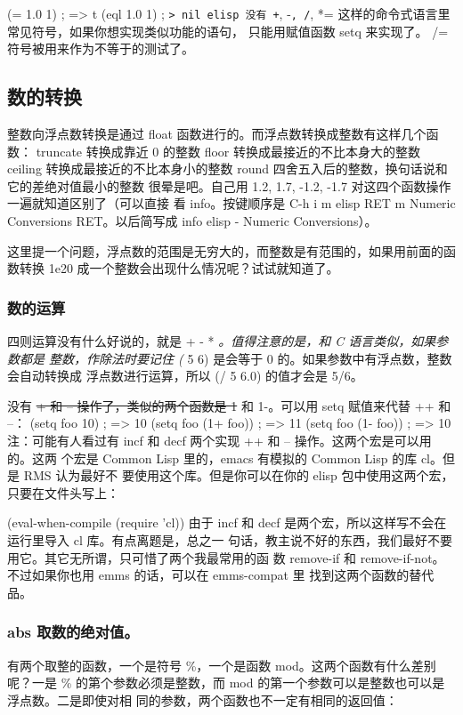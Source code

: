 \documentclass[11pt]{ctexart}
\begin{document}
(= 1.0 1)                               ; => t
(eql 1.0 1)                             ; \texttt{> nil
    elisp 没有 +}, -\texttt{, /}, *= 这样的命令式语言里常见符号，如果你想实现类似功能的语句，
只能用赋值函数 setq 来实现了。 /= 符号被用来作为不等于的测试了。

\subsection{数的转换}
\label{sec:org3078360}
整数向浮点数转换是通过 float 函数进行的。而浮点数转换成整数有这样几个函数：
truncate 转换成靠近 0 的整数
floor 转换成最接近的不比本身大的整数
ceiling 转换成最接近的不比本身小的整数
round 四舍五入后的整数，换句话说和它的差绝对值最小的整数
很晕是吧。自己用 1.2, 1.7, -1.2, -1.7 对这四个函数操作一遍就知道区别了（可以直接
看 info。按键顺序是 C-h i m elisp RET m Numeric Conversions RET。以后简写成 info
elisp - Numeric Conversions）。

这里提一个问题，浮点数的范围是无穷大的，而整数是有范围的，如果用前面的函数转换
1e20 成一个整数会出现什么情况呢？试试就知道了。

\subsubsection{数的运算}
\label{sec:org624879b}
四则运算没有什么好说的，就是 + - * \emph{。值得注意的是，和 C 语言类似，如果参数都是
整数，作除法时要记住 (} 5 6) 是会等于 0 的。如果参数中有浮点数，整数会自动转换成
浮点数进行运算，所以 (/ 5 6.0) 的值才会是 5/6。

没有 \sout{+ 和 -- 操作了，类似的两个函数是 1} 和 1-。可以用 setq 赋值来代替 ++ 和 --：
(setq foo 10)                           ; => 10
(setq foo (1+ foo))                     ; => 11
(setq foo (1- foo))                     ; => 10
注：可能有人看过有 incf 和 decf 两个实现 ++ 和 -- 操作。这两个宏是可以用的。这两
个宏是 Common Lisp 里的，emacs 有模拟的 Common Lisp 的库 cl。但是 RMS 认为最好不
要使用这个库。但是你可以在你的 elisp 包中使用这两个宏，只要在文件头写上：

(eval-when-compile
(require 'cl))
由于 incf 和 decf 是两个宏，所以这样写不会在运行里导入 cl 库。有点离题是，总之一
句话，教主说不好的东西，我们最好不要用它。其它无所谓，只可惜了两个我最常用的函
数 remove-if 和 remove-if-not。不过如果你也用 emms 的话，可以在 emms-compat 里
找到这两个函数的替代品。

\subsubsection{abs 取数的绝对值。}
\label{sec:orgd31e5c6}
有两个取整的函数，一个是符号 \%，一个是函数 mod。这两个函数有什么差别呢？一是 \%
的第个参数必须是整数，而 mod 的第一个参数可以是整数也可以是浮点数。二是即使对相
同的参数，两个函数也不一定有相同的返回值：
\end{document}
